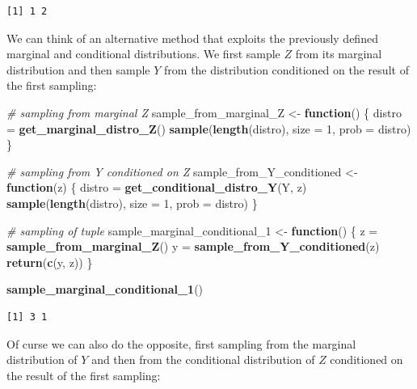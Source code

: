 \documentclass[
]{article}
\newenvironment{Shaded}{\begin{snugshade}}{\end{snugshade}}
\newcommand{\AttributeTok}[1]{\textcolor[rgb]{0.13,0.29,0.53}{#1}}
\newcommand{\CommentTok}[1]{\textcolor[rgb]{0.56,0.35,0.01}{\textit{#1}}}
\newcommand{\ControlFlowTok}[1]{\textcolor[rgb]{0.13,0.29,0.53}{\textbf{#1}}}
\newcommand{\DecValTok}[1]{\textcolor[rgb]{0.00,0.00,0.81}{#1}}
\newcommand{\FunctionTok}[1]{\textcolor[rgb]{0.13,0.29,0.53}{\textbf{#1}}}
\newcommand{\NormalTok}[1]{#1}
\newcommand{\OtherTok}[1]{\textcolor[rgb]{0.56,0.35,0.01}{#1}}
\begin{document}
\begin{verbatim}
[1] 1 2
\end{verbatim}

We can think of an alternative method that exploits the previously
defined marginal and conditional distributions. We first sample \(Z\)
from its marginal distribution and then sample \(Y\) from the
distribution conditioned on the result of the first sampling:

\begin{Shaded}
\begin{Highlighting}[]
\CommentTok{\# sampling from marginal Z}
\NormalTok{sample\_from\_marginal\_Z }\OtherTok{\textless{}{-}} \ControlFlowTok{function}\NormalTok{() \{}
\NormalTok{    distro }\OtherTok{=} \FunctionTok{get\_marginal\_distro\_Z}\NormalTok{()}
    \FunctionTok{sample}\NormalTok{(}\FunctionTok{length}\NormalTok{(distro), }\AttributeTok{size =} \DecValTok{1}\NormalTok{, }\AttributeTok{prob =}\NormalTok{ distro)}
\NormalTok{\}}

\CommentTok{\# sampling from Y conditioned on Z}
\NormalTok{sample\_from\_Y\_conditioned }\OtherTok{\textless{}{-}} \ControlFlowTok{function}\NormalTok{(z) \{}
\NormalTok{    distro }\OtherTok{=} \FunctionTok{get\_conditional\_distro\_Y}\NormalTok{(Y, z)}
    \FunctionTok{sample}\NormalTok{(}\FunctionTok{length}\NormalTok{(distro), }\AttributeTok{size =} \DecValTok{1}\NormalTok{, }\AttributeTok{prob =}\NormalTok{ distro)}
\NormalTok{\}}

\CommentTok{\# sampling of tuple}
\NormalTok{sample\_marginal\_conditional\_1 }\OtherTok{\textless{}{-}} \ControlFlowTok{function}\NormalTok{() \{}
\NormalTok{    z }\OtherTok{=} \FunctionTok{sample\_from\_marginal\_Z}\NormalTok{()}
\NormalTok{    y }\OtherTok{=} \FunctionTok{sample\_from\_Y\_conditioned}\NormalTok{(z)}
    \FunctionTok{return}\NormalTok{(}\FunctionTok{c}\NormalTok{(y, z))}
\NormalTok{\}}

\FunctionTok{sample\_marginal\_conditional\_1}\NormalTok{()}
\end{Highlighting}
\end{Shaded}

\begin{verbatim}
[1] 3 1
\end{verbatim}

Of curse we can also do the opposite, first sampling from the marginal
distribution of \(Y\) and then from the conditional distribution of
\(Z\) conditioned on the result of the first sampling:
\end{document}
